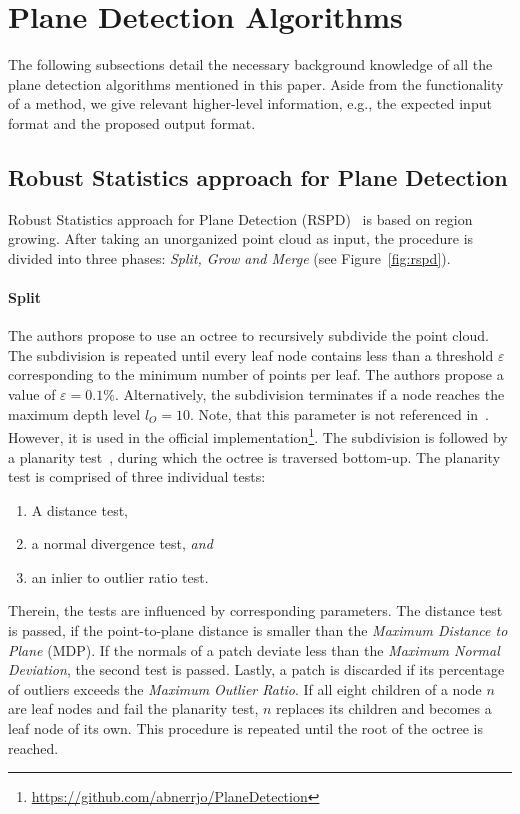\documentclass[main.tex]{subfiles}
\begin{document}
\section{Plane Detection Algorithms}
The following subsections detail the necessary background knowledge of all the plane detection algorithms mentioned in this paper.
Aside from the functionality of a method, we give relevant higher-level information, e.g., the expected input format and the proposed output format.

\subsection{Robust Statistics approach for Plane Detection}
\label{subsec:bg-rspd}


Robust Statistics approach for Plane Detection (RSPD)~\cite{Araújo_Oliveira_2020} is based on region growing.
After taking an unorganized point cloud as input, the procedure is divided into three phases:
\textit{Split, Grow and Merge} (see Figure~\ref{fig:rspd}).

\paragraph{Split}
The authors propose to use an octree to recursively subdivide the point cloud. 
The subdivision is repeated until every leaf node contains less than a threshold $\varepsilon$ corresponding to the 
minimum number of points per leaf. The authors propose a value of $\varepsilon = 0.1\%$. Alternatively, the subdivision terminates
if a node reaches the maximum depth level $l_O = 10$. Note, that this parameter is not referenced in~\cite{Araújo_Oliveira_2020}. 
However, it is used in the official implementation\footnote{\href{keyhttps://github.com/abnerrjo/PlaneDetection}{https://github.com/abnerrjo/PlaneDetection}}.
The subdivision is followed by a planarity test~\cite[Section~3.2]{Araújo_Oliveira_2020}, during which the octree is traversed bottom-up. 
The planarity test is comprised of three individual tests: 
\begin{enumerate}
    \item A distance test,
    \item a normal divergence test, \textit{and}
    \item an inlier to outlier ratio test.
\end{enumerate}
Therein, the tests are influenced by corresponding parameters. The distance test is passed, if the point-to-plane distance is smaller than 
the \textit{Maximum Distance to Plane} (MDP). If the normals of a patch deviate less than the \textit{Maximum Normal Deviation},
the second test is passed. Lastly, a patch is discarded if its percentage of outliers exceeds the \textit{Maximum Outlier Ratio}. 
If all eight children of a node $n$ are leaf nodes and fail the planarity test, $n$ replaces its children
and becomes a leaf node of its own. This procedure is repeated until the root of the octree is reached.
\end{document}
